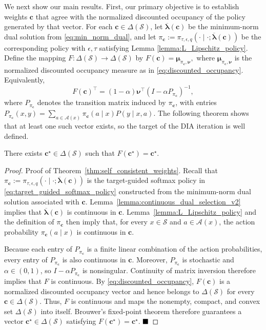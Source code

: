 \documentclass[sglanonrev]{informs4}
\providecommand{\bc}{\boldsymbol{c}}
\providecommand{\blambda}{\boldsymbol{\lambda}}
\providecommand{\bmu}{\boldsymbol{\mu}}
\providecommand{\bnu}{\boldsymbol{\nu}}
\begin{document}
We next show our main results. First, our primary objective is to establish weights $\bc$ that agree with the normalized discounted occupancy of the policy generated by that vector. For each $\bc\in\Delta(\mathcal S)$, let $\overline{\blambda}(\bc)$ be the minimum-norm dual solution from \eqref{eq:min_norm_dual}, and let $\pi_{\bc}:=\pi_{\tau,\epsilon,q}(\cdot\mid\cdot;\overline{\blambda}(\bc))$ be the corresponding policy with $\epsilon, \tau$ satisfying Lemma \ref{lemma:L_Lipschitz_policy}. Define the mapping $F:\Delta(\mathcal S)\to\Delta(\mathcal S)$ by 
$
F(\bc)
=
\bmu_{\pi_{\bc},\bnu},
$ 
where $\bmu_{\pi_{\bc},\bnu}$ is the normalized discounted occupancy measure as in \eqref{eq:discounted_occupancy}.
Equivalently,
\begin{equation}
F(\bc)^\top
=
(1-\alpha)\bnu^\top(I-\alpha P_{\pi_{\bc}})^{-1},
\end{equation}
where $P_{\pi_{\bc}}$ denotes the transition matrix induced by $\pi_{\bc}$, with entries $P_{\pi_{\bc}}(x,y)=\sum_{a\in\mathcal A(x)}\pi_{\bc}(a\mid x)P(y\mid x,a)$. 
The following theorem shows that at least one such vector exists, so the target of the \ac{DIA} iteration is well defined.

\begin{theorem}
\label{thm:self_consistent_weights}
There exists $\bc^\star\in \Delta(\mathcal{S})$ such that $F(\bc^\star)=\bc^\star$.
\end{theorem}
\begin{proof}{Proof of Theorem~\ref{thm:self_consistent_weights}.}
Recall that
$\pi_{\bc}:=\pi_{\tau,\epsilon,q}(\cdot\mid\cdot;
\overline{\blambda}(\bc))$ is the target-guided softmax policy in
\eqref{eq:target_guided_softmax_policy} constructed from the
minimum-norm dual solution associated with $\bc$.
Lemma~\ref{lemma:continuous_dual_selection_v2} implies that
$\overline{\blambda}(\bc)$ is continuous in $\bc$. Lemma~\ref{lemma:L_Lipschitz_policy}
and the definition of $\pi_{\bc}$ then imply that, for every
$x\in\mathcal S$ and $a\in\mathcal A(x)$, the action probability
$\pi_{\bc}(a\mid x)$ is continuous in $\bc$. 

Because each entry of
$P_{\pi_{\bc}}$ is a finite linear combination of the action
probabilities, every entry of $P_{\pi_{\bc}}$ is also continuous in
$\bc$. Moreover,
$P_{\pi_{\bc}}$ is stochastic and $\alpha\in(0,1)$, so
$I-\alpha P_{\pi_{\bc}}$ is nonsingular. Continuity of matrix inversion
therefore implies that $F$ is continuous. By \eqref{eq:discounted_occupancy}, $F(\bc)$ is a normalized discounted
occupancy vector and hence belongs to $\Delta(\mathcal S)$ for every
$\bc\in\Delta(\mathcal S)$. Thus, $F$ is continuous and maps the
nonempty, compact, and convex set $\Delta(\mathcal S)$ into itself. Brouwer's
fixed-point theorem therefore guarantees a vector
$\bc^\star\in\Delta(\mathcal S)$ satisfying
$F(\bc^\star)=\bc^\star$.
$\hfill\blacksquare$
\end{proof}
\end{document}
